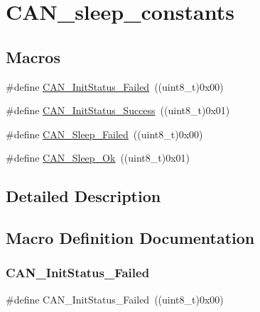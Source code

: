 \hypertarget{group___c_a_n__sleep__constants}{}\section{C\+A\+N\+\_\+sleep\+\_\+constants}
\label{group___c_a_n__sleep__constants}
\subsection*{Macros}
\begin{DoxyCompactItemize}
\item 
\#define \mbox{\hyperlink{group___c_a_n__sleep__constants_ga095c319e8c54c974eb2b6eeadf180d96}{C\+A\+N\+\_\+\+Init\+Status\+\_\+\+Failed}}~((uint8\+\_\+t)0x00)
\item 
\#define \mbox{\hyperlink{group___c_a_n__sleep__constants_ga6bed5957af8f2f6b00568e15ccac5772}{C\+A\+N\+\_\+\+Init\+Status\+\_\+\+Success}}~((uint8\+\_\+t)0x01)
\item 
\#define \mbox{\hyperlink{group___c_a_n__sleep__constants_ga169500ab7169c4e9c7e9e4ea34b3e070}{C\+A\+N\+\_\+\+Sleep\+\_\+\+Failed}}~((uint8\+\_\+t)0x00)
\item 
\#define \mbox{\hyperlink{group___c_a_n__sleep__constants_gaf5c4e9d32d4faff9d0bf61e153ed7998}{C\+A\+N\+\_\+\+Sleep\+\_\+\+Ok}}~((uint8\+\_\+t)0x01)
\end{DoxyCompactItemize}


\subsection{Detailed Description}


\subsection{Macro Definition Documentation}
\mbox{\label{group___c_a_n__sleep__constants_ga095c319e8c54c974eb2b6eeadf180d96}} 
\subsubsection{\texorpdfstring{CAN\_InitStatus\_Failed}{CAN\_InitStatus\_Failed}}
{\footnotesize\ttfamily \#define C\+A\+N\+\_\+\+Init\+Status\+\_\+\+Failed~((uint8\+\_\+t)0x00)}

